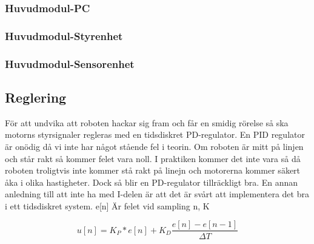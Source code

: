 \subsubsection{Huvudmodul-PC}
\subsubsection{Huvudmodul-Styrenhet}
\subsubsection{Huvudmodul-Sensorenhet}
\subsection{Reglering}
För att undvika att roboten hackar sig fram och får en smidig rörelse så ska motorns styrsignaler regleras med en tidsdiskret PD-regulator. En PID regulator är onödig då vi inte har något stående fel i teorin. Om roboten är mitt på linjen och står rakt så kommer felet vara noll. I praktiken kommer det inte vara så då roboten troligtvis inte kommer stå rakt på linejn och motorerna kommer säkert åka i olika hastigheter. Dock så blir en PD-regulator tillräckligt bra. En annan anledning till att inte ha med I-delen är att det är svårt att implementera det bra i ett tidsdiskret system. e[n] Är felet vid sampling n, K

 $$ u[n] = K_P*e[n] + K_D\frac{e[n]-e[n-1]}{\Delta T}$$

